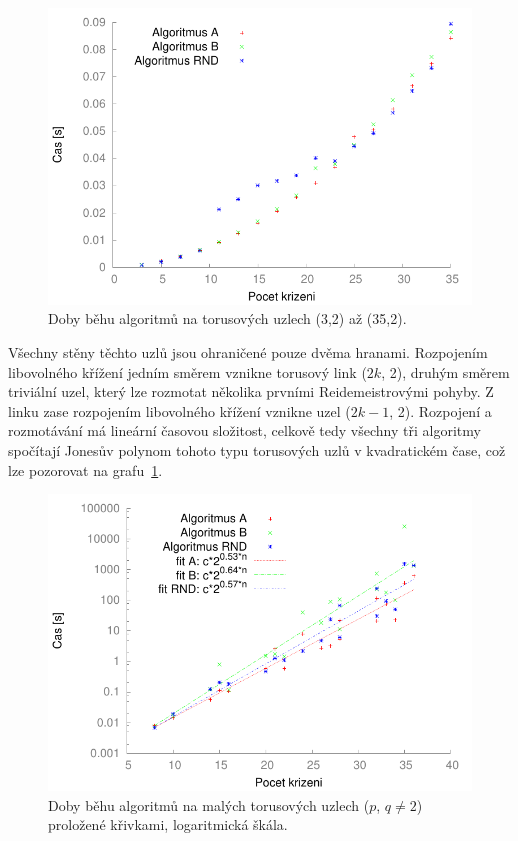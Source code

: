 \begin{figure}[p]\centering
\includegraphics{../img/torus2}
\caption{Doby běhu algoritmů na torusových uzlech (3,2) až (35,2).}
\label{obr03:torus2}
\end{figure}

Všechny stěny těchto uzlů jsou ohraničené pouze dvěma hranami. Rozpojením libovolného křížení jedním směrem vznikne torusový link ($2k$, 2), druhým směrem triviální uzel, který lze rozmotat několika prvními Reidemeistrovými pohyby. Z linku zase rozpojením libovolného křížení vznikne uzel ($2k-1$, 2). Rozpojení a rozmotávání má lineární časovou složitost, celkově tedy všechny tři algoritmy spočítají Jonesův polynom tohoto typu torusových uzlů v kvadratickém čase, což lze pozorovat na grafu~\ref{obr03:torus2}.

\begin{figure}[p]\centering
\includegraphics{../img/torusNe2FIT}
\caption{Doby běhu algoritmů na malých torusových uzlech ($p$, $q\neq 2$) proložené křivkami, logaritmická škála.}
\label{obr03:torusFIT}
\end{figure}

